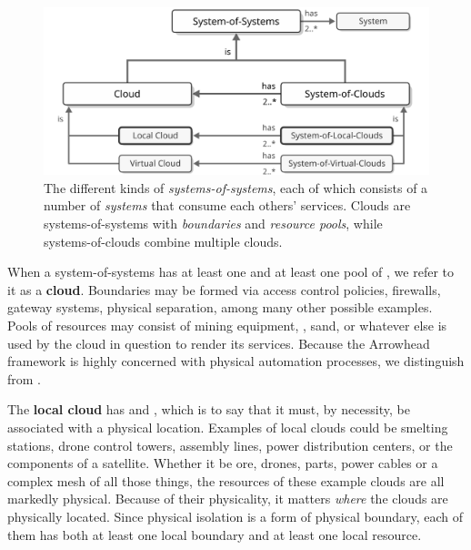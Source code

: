 \begin{figure}[ht!]
  \centering
  \includegraphics[scale=0.9]{figures/system-of-systems}
  \caption{
    The different kinds of \textit{systems-of-systems}, each of which consists of a number of \textit{systems} that consume each others' services.
    Clouds are systems-of-systems with \textit{boundaries} and \textit{resource pools}, while systems-of-clouds combine multiple clouds.
  }
  \label{fig:system-of-systems}
\end{figure}

\vfill

When a system-of-systems has at least one  and at least one pool of , we refer to it as a \textbf{cloud}.
Boundaries may be formed via access control policies, firewalls, gateway systems, physical separation, among many other possible examples.
Pools of resources may consist of mining equipment, , sand, or whatever else is used by the cloud in question to render its services.
Because the Arrowhead framework is highly concerned with physical automation processes, we distinguish  from .

The \textbf{local cloud} has  and , which is to say that it must, by necessity, be associated with a physical location.
Examples of local clouds could be smelting stations, drone control towers, assembly lines, power distribution centers, or the components of a satellite.
Whether it be ore, drones, parts, power cables or a complex mesh of all those things, the resources of these example clouds are all markedly physical.
Because of their physicality, it matters \textit{where} the clouds are physically located.
Since physical isolation is a form of physical boundary, each of them has both at least one local boundary and at least one local resource.

